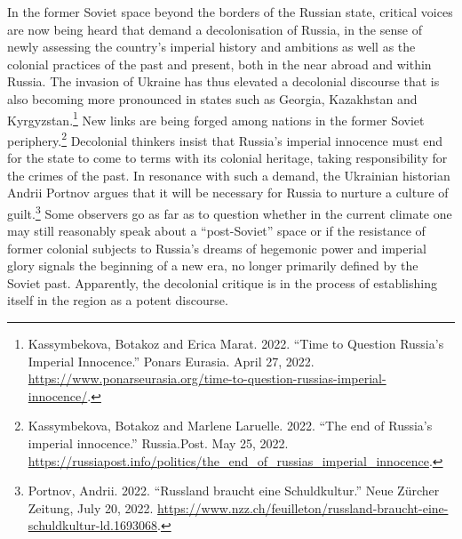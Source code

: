 \documentclass[
  english,
  a4paper,
  DIV=12,
  footlines=2.1,
  usegeometry=true]{scrartcl}
\begin{document}
\leavevmode\marginpar{\textcolor{parnum}{{[}3{]}}}In the former Soviet
space beyond the borders of the Russian state, critical voices are now
being heard that demand a decolonisation of Russia, in the sense of
newly assessing the country's imperial history and ambitions as well as
the colonial practices of the past and present, both in the near abroad
and within Russia. The invasion of Ukraine has thus elevated a
decolonial discourse that is also becoming more pronounced in states
such as Georgia, Kazakhstan and Kyrgyzstan.\footnote{Kassymbekova,
  Botakoz and Erica Marat. 2022. ``Time to Question Russia's Imperial
  Innocence.'' Ponars Eurasia. April 27, 2022.
  \url{https://www.ponarseurasia.org/time-to-question-russias-imperial-innocence/}.}
New links are being forged among nations in the former Soviet
periphery.\footnote{Kassymbekova, Botakoz and Marlene Laruelle. 2022.
  ``The end of Russia's imperial innocence.'' Russia.Post. May 25, 2022.
  \url{https://russiapost.info/politics/the_end_of_russias_imperial_innocence}.}
Decolonial thinkers insist that Russia's imperial innocence must end for
the state to come to terms with its colonial heritage, taking
responsibility for the crimes of the past. In resonance with such a
demand, the Ukrainian historian Andrii Portnov argues that it will be
necessary for Russia to nurture a culture of guilt.\footnote{Portnov,
  Andrii. 2022. ``Russland braucht eine Schuldkultur.'' Neue Zürcher
  Zeitung, July 20, 2022.
  \url{https://www.nzz.ch/feuilleton/russland-braucht-eine-schuldkultur-ld.1693068}.}
Some observers go as far as to question whether in the current climate
one may still reasonably speak about a ``post-Soviet'' space or if the
resistance of former colonial subjects to Russia's dreams of hegemonic
power and imperial glory signals the beginning of a new era, no longer
primarily defined by the Soviet past. Apparently, the decolonial
critique is in the process of establishing itself in the region as a
potent discourse.
\end{document}

